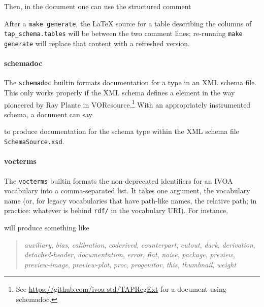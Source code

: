 \documentclass[11pt,a4paper]{ivoa}
\begin{document}
Then, in the document one can use the structured comment



After a \texttt{make generate}, the LaTeX source for a table describing
the columns of \texttt{tap\_schema.tables} will be between the two
comment lines; re-running \texttt{make generate} will replace that
content with a refreshed version.

\paragraph{schemadoc}

The \texttt{schemadoc} builtin formats
documentation for a type in an XML schema file.  This only works
properly if the XML schema defines a  element in
the way pioneered by Ray Plante in
VOResource.\footnote{See
\url{https://github.com/ivoa-std/TAPRegExt} for a document using
schemadoc.}
With an appropriately instrumented schema, a document can say

to produce documentation for the schema type  within
the XML schema file \texttt{SchemaSource.xsd}.

\paragraph{vocterms}

The \texttt{vocterms} builtin formats the non-deprecated identifiers for
an IVOA vocabulary \citep{2021ivoa.spec.0525D} into a comma-separated
list.  It takes one argument, the vocabulary name (or, for legacy
vocabularies that have path-like names, the relative path; in practice:
whatever is behind \texttt{rdf/} in the vocabulary URI).  For instance,



will produce something like

\begin{quotation}
\noindent
\textsl{auxiliary},
\textsl{bias},
\textsl{calibration},
\textsl{coderived},
\textsl{counterpart},
\textsl{cutout},
\textsl{dark},
\textsl{derivation},
\textsl{detached-header},
\textsl{documentation},
\textsl{error},
\textsl{flat},
\textsl{noise},
\textsl{package},
\textsl{preview},
\textsl{preview-image},
\textsl{preview-plot},
\textsl{proc},
\textsl{progenitor},
\textsl{this},
\textsl{thumbnail},
\textsl{weight}
\end{quotation}
\end{document}

